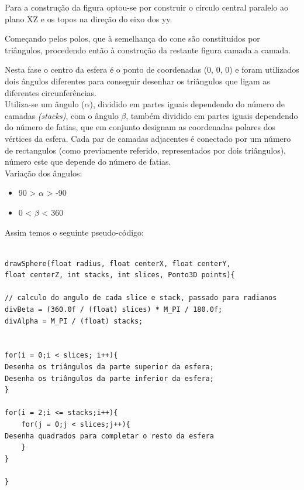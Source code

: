Para a construção da figura optou-se por construir o círculo central paralelo ao plano XZ e os topos na direção do eixo dos yy. 

Começando pelos polos, que à semelhança do cone são constituídos por triângulos, procedendo então à construção da restante figura camada a camada. 


Nesta fase o centro da esfera é o ponto de coordenadas (0, 0, 0) e foram utilizados dois ângulos diferentes para conseguir desenhar os triângulos que ligam as diferentes circunferências.\\


Utiliza-se um ângulo ($\alpha$), dividido em partes iguais dependendo do
número de camadas \textit{(stacks)}, com o ângulo  $\beta$, também dividido em partes iguais dependendo do número de fatias, que em conjunto designam as coordenadas polares dos vértices da esfera. Cada par de camadas adjacentes é conectado por um número de rectangulos (como previamente referido, representados por dois triângulos), número este que depende do número de fatias.\\

Variação dos ângulos: 
\begin{itemize}
	\item 90 > $\alpha$ > -90
	\item 0 < $\beta$ < 360 
\end{itemize}

 
Assim temos o seguinte pseudo-código:

\begin{Verbatim}

drawSphere(float radius, float centerX, float centerY,
float centerZ, int stacks, int slices, Ponto3D points){

// calculo do angulo de cada slice e stack, passado para radianos
divBeta = (360.0f / (float) slices) * M_PI / 180.0f;
divAlpha = M_PI / (float) stacks;  


for(i = 0;i < slices; i++){
Desenha os triângulos da parte superior da esfera;
Desenha os triângulos da parte inferior da esfera;
}

for(i = 2;i <= stacks;i++){
	for(j = 0;j < slices;j++){
Desenha quadrados para completar o resto da esfera
	}
}

}

\end{Verbatim}

